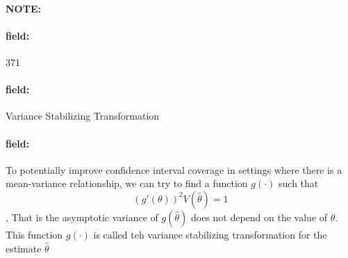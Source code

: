 \documentclass[12pt]{article}
\newenvironment{note}{\paragraph{NOTE:}}{}
\newenvironment{field}{\paragraph{field:}}{}
\begin{document}
\begin{note}
    \begin{field}
        \tiny 371
    \end{field}
    \begin{field}
        Variance Stabilizing Transformation
    \end{field}
    \begin{field}
        To potentially improve confidence interval coverage in settings where there is a mean-variance relationship, we can try to find a function $g(\cdot)$ such that $$(g'(\theta))^2V(\hat{\theta}) = 1 $$, That is the asymptotic variance of $g(\hat{\theta})$ does not depend on the value of $\theta$. This function $g(\cdot)$ is called teh variance stabilizing transformation for the estimate $\hat{\theta}$
    \end{field}
\end{note}


\end{document}

